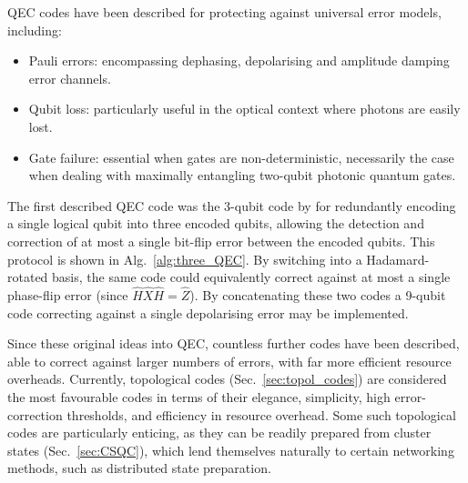 \documentclass[aps,rmp,twocolumn,amsmath,amssymb,nofootinbib,superscriptaddress,longbibliography,floatfix,table-of-contents,eqsecnum]{revtex4-1}
\newcommand{\comment}[1]{{\color{blue}{\textbf{#1}}}}
\begin{document}
QEC codes have been described for protecting against universal error models, including:
\begin{itemize}
\item Pauli errors: encompassing dephasing, depolarising and amplitude damping \comment{Is A.D a Pauli channel?} error channels.
\item Qubit loss: particularly useful in the optical context where photons are easily lost.
\item Gate failure: essential when gates are non-deterministic, necessarily the case when dealing with maximally entangling two-qubit photonic quantum gates.
\end{itemize}

The first described QEC code was the 3-qubit code by \cite{bib:Shor95} for redundantly encoding a single logical qubit into three encoded qubits, allowing the detection and correction of at most a single bit-flip error between the encoded qubits. This protocol is shown in Alg.~\ref{alg:three_QEC}. By switching into a Hadamard-rotated basis, the same code could equivalently correct against at most a single phase-flip error (since \mbox{$\hat{H}\hat{X}\hat{H}=\hat{Z}$}). By concatenating these two codes a 9-qubit code correcting against a single depolarising error may be implemented.

Since these original ideas into QEC, countless further codes have been described, able to correct against larger numbers of errors, with far more efficient resource overheads. Currently, topological codes (Sec.~\ref{sec:topol_codes}) are considered the most favourable codes in terms of their elegance, simplicity, high error-correction thresholds, and efficiency in resource overhead. Some such topological codes are particularly enticing, as they can be readily prepared from cluster states (Sec.~\ref{sec:CSQC}), which lend themselves naturally to certain networking methods, such as distributed state preparation.
\end{document}
